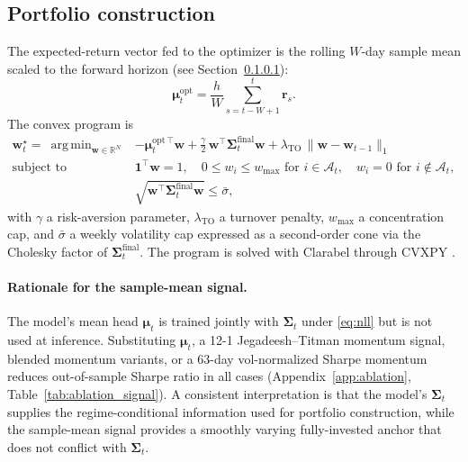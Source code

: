 \documentclass[11pt]{article}
\newcommand{\R}{\mathbb{R}}
\newcommand{\Sig}{\boldsymbol{\Sigma}}
\newcommand{\bmu}{\boldsymbol{\mu}}
\newcommand{\br}{\mathbf{r}}
\newcommand{\bw}{\mathbf{w}}
\DeclareMathOperator*{\argmin}{arg\,min}
\begin{document}
\subsection{Portfolio construction}\label{sec:portfolio}

The expected-return vector fed to the optimizer is the rolling $W$-day
sample mean scaled to the forward horizon (see
Section~\ref{sec:training_use_mu}):
\begin{equation}
\bmu_t^{\text{opt}} = \frac{h}{W}\sum_{s=t-W+1}^{t} \br_s.
\label{eq:mu_sample}
\end{equation}
The convex program is
\begin{equation}
\begin{aligned}
\bw_t^\star =\ \argmin_{\bw \in \R^N}\quad
& -\bmu_t^{\text{opt}\,\top}\bw
+ \tfrac{\gamma}{2}\,\bw^\top \Sig_t^{\text{final}} \bw
+ \lambda_{\text{TO}}\,\|\bw - \bw_{t-1}\|_1\\
\text{subject to}\quad
& \mathbf{1}^\top \bw = 1,
\quad
0 \leq w_i \leq w_{\max} \text{ for } i\in\mathcal{A}_t,
\quad
w_i = 0 \text{ for } i\notin\mathcal{A}_t,\\
& \sqrt{\bw^\top \Sig_t^{\text{final}} \bw} \leq \bar{\sigma},
\end{aligned}
\label{eq:opt}
\end{equation}
with $\gamma$ a risk-aversion parameter, $\lambda_{\text{TO}}$ a
turnover penalty, $w_{\max}$ a concentration cap, and $\bar{\sigma}$ a
weekly volatility cap expressed as a second-order cone via the Cholesky
factor of $\Sig_t^{\text{final}}$. The program is solved with Clarabel
\citep{clarabel} through CVXPY \citep{cvxpy2016}.

\paragraph{Rationale for the sample-mean signal.}\label{sec:training_use_mu}
The model's mean head $\bmu_t$ is trained jointly with $\Sig_t$ under
\eqref{eq:nll} but is not used at inference. Substituting $\bmu_t$, a
12-1 Jegadeesh--Titman momentum signal, blended momentum variants, or
a 63-day vol-normalized Sharpe momentum reduces out-of-sample Sharpe
ratio in all cases (Appendix~\ref{app:ablation},
Table~\ref{tab:ablation_signal}). A consistent interpretation is that
the model's $\Sig_t$ supplies the regime-conditional information used
for portfolio construction, while the sample-mean signal provides a
smoothly varying fully-invested anchor that does not conflict with
$\Sig_t$.
\end{document}
